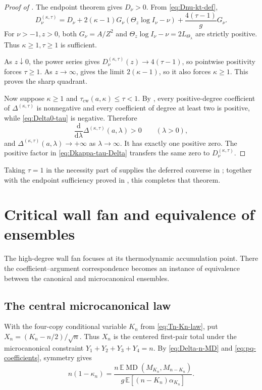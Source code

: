 \documentclass[11pt,a4paper]{amsart}
\numberwithin{equation}{section}
\theoremstyle{plain}
\theoremstyle{definition}
\newcommand{\E}{\mathbb E}
\newcommand{\MD}{\operatorname{MD}}
\newcommand{\Thetal}{\Theta_{\lambda}}
\newcommand{\Thetaz}{\Theta_z}
\begin{document}
\begin{proof}[Proof of ]
The endpoint theorem gives \(D_\nu>0\).  From \eqref{eq:Dnu-kt-def},
\[
 D_\nu^{(\kappa,\tau)}
 =D_\nu
 +2(\kappa-1)G_\nu(\Thetaz\log I_\nu-\nu)
 +\frac{4(\tau-1)}gG_\nu.
\]
For \(\nu>-1,z>0\), both \(G_\nu=A/Z^2\) and
\(\Thetaz\log I_\nu-\nu=2L_{\Thetal}\) are strictly positive.  Thus
\(\kappa\ge1,\tau\ge1\) is sufficient.

As \(z\downarrow0\), the power series gives
\(D_\nu^{(\kappa,\tau)}(z)\to4(\tau-1)\),
so pointwise positivity forces \(\tau\ge1\).  As \(z\to\infty\),
 gives the limit \(2(\kappa-1)\), so it also
forces \(\kappa\ge1\).  This proves the sharp quadrant.

Now suppose
\(\kappa\ge1\) and
\(\tau_{\mathrm{cw}}(a,\kappa)\le\tau<1\).  By
, every positive-degree coefficient of
\(\Delta^{(\kappa,\tau)}\) is nonnegative and every coefficient of degree at
least two is positive, while \eqref{eq:Delta0-tau} is negative.  Therefore
\[
 \frac{\mathrm d}{\mathrm d\lambda}\Delta^{(\kappa,\tau)}(a,\lambda)>0
 \qquad(\lambda>0),
\]
and \(\Delta^{(\kappa,\tau)}(a,\lambda)\to+\infty\) as
\(\lambda\to\infty\).  It has exactly one positive zero.  The positive factor
in \eqref{eq:Dkappa-tau-Delta} transfers the same zero to
\(D_\nu^{(\kappa,\tau)}\).
\end{proof}

Taking \(\tau=1\) in the necessity part of
 supplies the deferred converse in
; together with the endpoint sufficiency proved in
, this completes that theorem.


\section{Critical wall fan and equivalence of ensembles}\label{sec:scaling}

The high-degree wall fan focuses at its thermodynamic accumulation point.  There
the coefficient--argument correspondence becomes an instance of equivalence
between the canonical and microcanonical ensembles.

\subsection{The central microcanonical law}\label{subsec:central-microcanonical-law}

With the four-copy conditional variable \(K_n\) from \eqref{eq:Tn-Kn-law}, put
\(X_n=(K_n-n/2)/\sqrt n\).
Thus \(X_n\) is the centered first-pair total under the microcanonical
constraint \(Y_1+Y_2+Y_3+Y_4=n\).
By \eqref{eq:Delta-n-MD} and \eqref{eq:pq-coefficients}, symmetry gives
\begin{equation}\label{eq:threshold-expectation}
 n(1-\kappa_n)
 =\frac{n\,\E\MD(M_{K_n},M_{n-K_n})}
 {g\,\E[(n-K_n)\alpha_{K_n}]}.
\end{equation}
\end{document}
